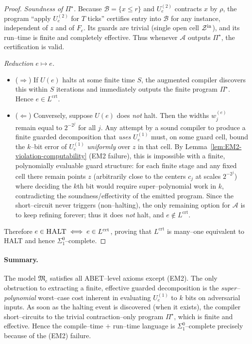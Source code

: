 \documentclass[12pt]{article}
\theoremstyle{definition}
\theoremstyle{plain}
\begin{document}
\begin{proof}
\emph{Soundness of $\Pi^\star$.} Because $\mathcal B=\{x\le r\}$ and $U_e^{(2)}$ contracts $x$ by $\rho$, the program “apply $U_e^{(2)}$ for $T$ ticks” certifies entry into $\mathcal B$ for any instance, independent of $z$ and of $F_e$. Its guards are trivial (single open cell $\mathcal Z^{\rm in}$), and its run–time is finite and completely effective. Thus whenever $\mathcal A$ outputs $\Pi^\star$, the certification is valid.

\emph{Reduction $e\mapsto e$.}
\begin{itemize}
\item ($\Rightarrow$) If $U(e)$ halts at some finite time $S$, the augmented compiler discovers this within $S$ iterations and immediately outputs the finite program $\Pi^\star$. Hence $e\in L^{\mathrm{crt}}$.

\item ($\Leftarrow$) Conversely, suppose $U(e)$ does \emph{not} halt. Then the widths $w_j^{(e)}$ remain equal to $2^{-2^{j}}$ for all $j$. Any attempt by a sound compiler to produce a finite guarded decomposition that \emph{uses} $U_e^{(1)}$ must, on some guard cell, bound the $k$–bit error of $U_e^{(1)}$ \emph{uniformly} over $z$ in that cell. By Lemma~\ref{lem:EM2-violation-computability} (EM2 failure), this is impossible with a finite, polynomially evaluable guard structure: for each finite stage and any fixed cell there remain points $z$ (arbitrarily close to the centers $c_j$ at scales $2^{-2^{j}}$) where deciding the $k$th bit would require super–polynomial work in $k$, contradicting the soundness/effectivity of the emitted program. Since the short–circuit never triggers (non–halting), the only remaining option for $\mathcal A$ is to keep refining forever; thus it does \emph{not} halt, and $e\notin L^{\mathrm{crt}}$.
\end{itemize}
Therefore $e\in\textsc{HALT}\iff e\in L^{\mathrm{crt}}$, proving that $L^{\mathrm{crt}}$ is many–one equivalent to \textsc{HALT} and hence $\Sigma^0_1$–complete.
\end{proof}

\paragraph{Summary.}
The model $\mathfrak M_e$ satisfies all ABET–level axioms except \textup{(EM2)}. The only obstruction to extracting a finite, effective guarded decomposition is the \emph{super–polynomial} worst–case cost inherent in evaluating $U_e^{(1)}$ to $k$ bits on adversarial inputs. As soon as the halting event is discovered (when it exists), the compiler short–circuits to the trivial contraction–only program $\Pi^\star$, which is finite and effective. Hence the compile–time $+$ run–time language is $\Sigma^0_1$–complete precisely because of the \textup{(EM2)} failure.
\end{document}
